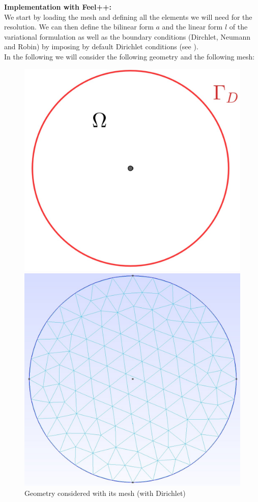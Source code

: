 \noindent \textbf{Implementation with Feel++:} \\
We start by loading the mesh and defining all the elements we will need for the resolution. We can then define the bilinear form $a$ and the linear form $l$ of the variational formulation as well as the boundary conditions (Dirchlet, Neumann and Robin) by imposing by default Dirichlet conditions (see \cite{feelpp_laplacian}). \\

\noindent In the following we will consider the following geometry and the following mesh:
\begin{figure}[H]
	\begin{minipage}{0.48\linewidth}
		\centering
		\includegraphics[width=0.7\linewidth]{"images/parareal/feelpp/circle.jpg"}
	\end{minipage}
	\begin{minipage}{0.48\linewidth}
		\centering
		\includegraphics[width=0.7\linewidth]{"images/parareal/feelpp/circle_mesh.jpg"}
	\end{minipage}
	\caption{Geometry considered with its mesh (with Dirichlet)}
\end{figure}


